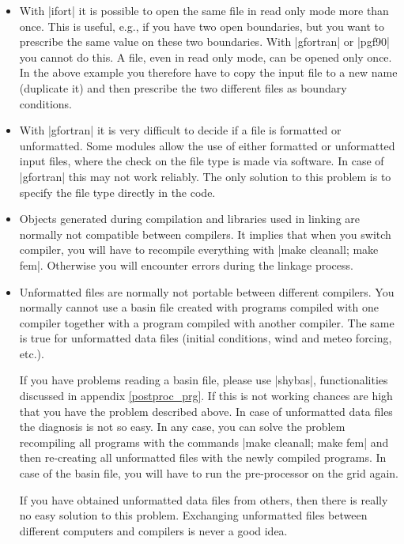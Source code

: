 \begin{itemize}

\item With |ifort| it is possible to open the same file in
read only mode more than once. This is useful, e.g., if you have two
open boundaries, but you want to prescribe the same value on these
two boundaries. With |gfortran| or |pgf90| you cannot do this. A file,
even in read only mode, can be opened only once. In the above example
you therefore have to copy the input file to a new name (duplicate it)
and then prescribe the two different files as boundary conditions.

\item With |gfortran| it is very difficult to decide if a file is
formatted or unformatted. Some modules allow the use of either formatted
or unformatted input files, where the check on the file type is made
via software. In case of |gfortran| this may not work reliably. The only
solution to this problem is to specify the file type directly in the code.

\item Objects generated during compilation and libraries used in linking
are normally not compatible between compilers. It implies that when you
 switch compiler, you will have to recompile everything with
|make cleanall; make fem|. Otherwise you will encounter errors during
the linkage process.

\item Unformatted files are normally not portable between different
compilers. You normally cannot use a basin file created with programs
compiled with one compiler together with a program compiled with another
compiler. The same is true for unformatted data files (initial conditions,
wind and meteo forcing, etc.).

If you have problems reading a basin file, please use |shybas|, functionalities discussed in appendix \ref{postproc_prg}.
If this is
not working chances are high that you have the problem described above.
In case of unformatted data files the diagnosis is not so easy. In any
case, you can solve the problem recompiling all programs with the commands
|make cleanall; make fem| and then re-creating all unformatted files
with the newly compiled programs. In case of the basin file, you will
have to run the pre-processor on the grid again.

If you have obtained unformatted data files from others, then there is
really no easy solution to this problem. Exchanging unformatted files
between different computers and compilers is never a good idea.


\end{itemize}
